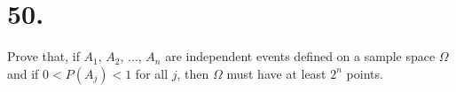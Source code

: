 \section*{50.}
Prove that, if $A_1$, $A_2$, $\ldots$, $A_n$ are independent events defined
on a sample space $\Omega$ and if $0<P(A_j)<1$ for all $j$, then $\Omega$
must have at least $2^n$ points.


